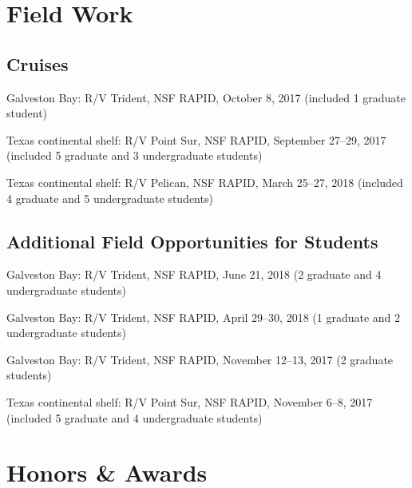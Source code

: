 \documentclass[10pt,letterpaper]{article}
\renewenvironment{itemize}{
  \begin{list}{}{
    \setlength{\leftmargin}{1.5em}
    \setlength{\itemsep}{0.25em}
    \setlength{\parskip}{0pt}
    \setlength{\parsep}{0.25em}
  }
}{
  \end{list}
}
\begin{document}
\section*{Field Work}

\subsection*{Cruises}
\begin{itemize}
    \item Galveston Bay: R/V Trident, NSF RAPID, October 8, 2017 (included 1 graduate student)
    \item Texas continental shelf: R/V Point Sur, NSF RAPID, September 27--29, 2017 (included 5 graduate and 3 undergraduate students)
    \item Texas continental shelf: R/V Pelican, NSF RAPID, March 25--27, 2018 (included 4 graduate and 5 undergraduate students)
\end{itemize}

\subsection*{Additional Field Opportunities for Students}
\begin{itemize}
    \item Galveston Bay: R/V Trident, NSF RAPID, June 21, 2018 (2 graduate and 4 undergraduate students)
    \item Galveston Bay: R/V Trident, NSF RAPID, April 29--30, 2018 (1 graduate and 2 undergraduate students)
    \item Galveston Bay: R/V Trident, NSF RAPID, November 12--13, 2017 (2 graduate students)
    \item Texas continental shelf: R/V Point Sur, NSF RAPID, November 6--8, 2017 (included 5 graduate and 4 undergraduate students)
\end{itemize}


\section*{Honors \& Awards}
\end{document}
